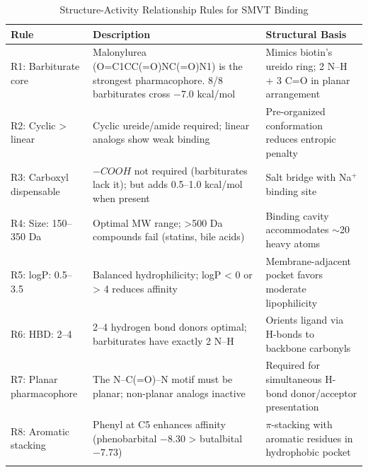 
\begin{table}[H]
\centering
\caption{Structure-Activity Relationship Rules for SMVT Binding}
\label{tab:sar_rules}
\begin{tabular}{p{}p{}p{}}
\toprule
\textbf{Rule} & \textbf{Description} & \textbf{Structural Basis} \\
\midrule
R1: Barbiturate core & Malonylurea (O=C1CC(=O)NC(=O)N1) is the strongest pharmacophore. 8/8 barbiturates cross $-$7.0 kcal/mol & Mimics biotin's ureido ring; 2 N--H + 3 C=O in planar arrangement \\
\addlinespace
R2: Cyclic > linear & Cyclic ureide/amide required; linear analogs show weak binding & Pre-organized conformation reduces entropic penalty \\
\addlinespace
R3: Carboxyl dispensable & $-COOH$ not required (barbiturates lack it); but adds 0.5--1.0 kcal/mol when present & Salt bridge with Na$^+$ binding site \\
\addlinespace
R4: Size: 150--350 Da & Optimal MW range; >500 Da compounds fail (statins, bile acids) & Binding cavity accommodates $\sim$20 heavy atoms \\
\addlinespace
R5: logP: 0.5--3.5 & Balanced hydrophilicity; logP < 0 or > 4 reduces affinity & Membrane-adjacent pocket favors moderate lipophilicity \\
\addlinespace
R6: HBD: 2--4 & 2--4 hydrogen bond donors optimal; barbiturates have exactly 2 N--H & Orients ligand via H-bonds to backbone carbonyls \\
\addlinespace
R7: Planar pharmacophore & The N--C(=O)--N motif must be planar; non-planar analogs inactive & Required for simultaneous H-bond donor/acceptor presentation \\
\addlinespace
R8: Aromatic stacking & Phenyl at C5 enhances affinity (phenobarbital $-8.30$ > butalbital $-7.73$) & $\pi$-stacking with aromatic residues in hydrophobic pocket \\
\addlinespace

\bottomrule
\end{tabular}
\end{table}
